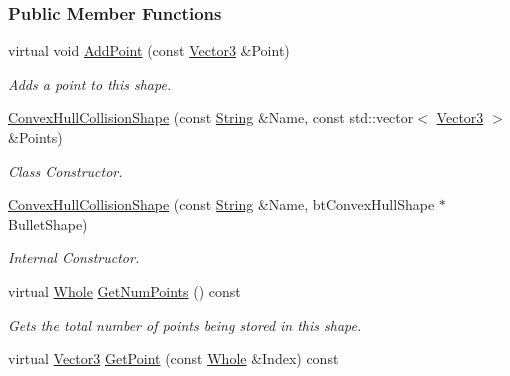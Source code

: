 \subsubsection*{Public Member Functions}
\begin{DoxyCompactItemize}
\item 
virtual void \hyperlink{classphys_1_1ConvexHullCollisionShape_a8e47c0d697b143ecc978b368ffff2ec2}{AddPoint} (const \hyperlink{classphys_1_1Vector3}{Vector3} \&Point)
\begin{DoxyCompactList}\small\item\em Adds a point to this shape. \item\end{DoxyCompactList}\item 
\hyperlink{classphys_1_1ConvexHullCollisionShape_ae97e0336957d89ecb035c119c8f7629e}{ConvexHullCollisionShape} (const \hyperlink{namespacephys_aa03900411993de7fbfec4789bc1d392e}{String} \&Name, const std::vector$<$ \hyperlink{classphys_1_1Vector3}{Vector3} $>$ \&Points)
\begin{DoxyCompactList}\small\item\em Class Constructor. \item\end{DoxyCompactList}\item 
\hyperlink{classphys_1_1ConvexHullCollisionShape_a2f33e11e85cfdd4fb6c848a472930522}{ConvexHullCollisionShape} (const \hyperlink{namespacephys_aa03900411993de7fbfec4789bc1d392e}{String} \&Name, btConvexHullShape $\ast$BulletShape)
\begin{DoxyCompactList}\small\item\em Internal Constructor. \item\end{DoxyCompactList}\item 
virtual \hyperlink{namespacephys_a460f6bc24c8dd347b05e0366ae34f34a}{Whole} \hyperlink{classphys_1_1ConvexHullCollisionShape_ac280ab9b121b379211a29569bb501ae3}{GetNumPoints} () const 
\begin{DoxyCompactList}\small\item\em Gets the total number of points being stored in this shape. \item\end{DoxyCompactList}\item 
virtual \hyperlink{classphys_1_1Vector3}{Vector3} \hyperlink{classphys_1_1ConvexHullCollisionShape_a42babaa53585ce146b12223d199f39b5}{GetPoint} (const \hyperlink{namespacephys_a460f6bc24c8dd347b05e0366ae34f34a}{Whole} \&Index) const 

\end{DoxyCompactItemize}
